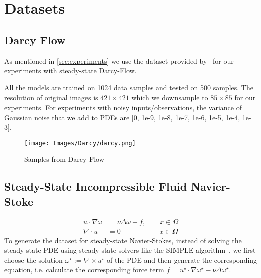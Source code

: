 \section{Datasets}

\subsection{Darcy Flow}
\label{subsec:Darcy_flow_implementation}
As mentioned in \cref{sec:experiments} 
we use the dataset provided by~\cite{li2020fourier} for our experiments with steady-state Darcy-Flow.

All the models are trained on 1024 data samples and tested on 500 samples. The resolution of original images is $421 \times 421$ which we downsample to $85 \times 85$ for our experiments. For experiments with noisy inputs/observations, the variance of Gaussian noise that we add to PDEs are [0, 1e-9, 1e-8, 1e-7, 1e-6, 1e-5, 1e-4, 1e-3]. 
\begin{figure}[!htbp]
    \centering
    \texttt{[image: Images/Darcy/darcy.png]}
    \label{fig:darcy_flow}
    \caption{Samples from Darcy Flow}
\end{figure}

\subsection{Steady-State Incompressible Fluid Navier-Stoke}
\label{subsec:navier_stokes_implementation}
\begin{align*}
    u \cdot \nabla \omega &= \nu \Delta \omega + f, \qquad x \in \Omega\\
    \nabla \cdot u &= 0 \qquad\qquad\quad\;\;  x \in \Omega
\end{align*}
To generate the dataset for steady-state Navier-Stokes, 
instead of solving the steady state PDE using 
steady-state solvers like the SIMPLE algorithm~\cite{patankar1983calculation},
we first choose the solution $\omega^\star := \nabla \times u^\star$
of the PDE and then generate the corresponding equation, i.e. calculate the corresponding force term 
$f = u^\star \cdot \nabla \omega^\star - \nu \Delta \omega^\star.$


